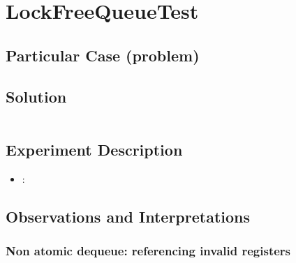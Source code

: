 \section{\textbf{LockFreeQueueTest}}

\subsection{Particular Case (problem)}

\subsection{Solution}

\begin{lstlisting}[style=numbers]

\end{lstlisting}
\hfill

\subsection{Experiment Description}

\begin{itemize}
  \item {}: 
\end{itemize}

\subsection{Observations and Interpretations}
\subsubsection{Non atomic dequeue: referencing invalid registers}


\begin{verbatim}
\end{verbatim}
\hfill

